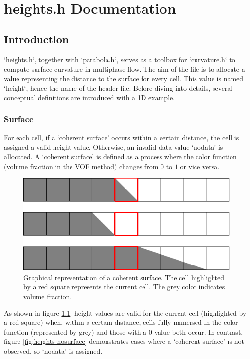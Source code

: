 \chapter{heights.h Documentation}
\ifsingle
\maketitle
\fi
\chaptermeta[2.0][2025-06-08]

\section{Introduction}\label{sec:heights-intro}
`heights.h`, together with `parabola.h`, serves as a toolbox for `curvature.h` to compute surface curvature in multiphase flow. The aim of the file is to allocate a value representing the distance to the surface for every cell. This value is named `height`, hence the name of the header file. Before diving into details, several conceptual definitions are introduced with a 1D example.

\subsection{Surface}
For each cell, if a `coherent surface' occurs within a certain distance, the cell is assigned a valid height value. Otherwise, an invalid data value `nodata' is allocated. A `coherent surface' is defined as a process where the color function (volume fraction in the VOF method)  changes from $0$ to $1$ or vice versa.

\begin{figure}[H]
  \centering
  \includegraphics{./image/heights-h/surface.pdf}
  \caption{Graphical representation of a coherent surface. The cell highlighted by a red square represents the current cell. The grey color indicates volume fraction.}
  \label{fig:heights-surface}
\end{figure}
As shown in figure \ref{fig:heights-surface}, height values are valid for the current cell (highlighted by a red square) when, within a certain distance, cells fully immersed in the color function (represented by grey) and those with a $0$ value both occur. In contrast, figure \ref{fig:heights-nosurface} demonstrates cases where a `coherent surface' is not observed, so `nodata' is assigned.

